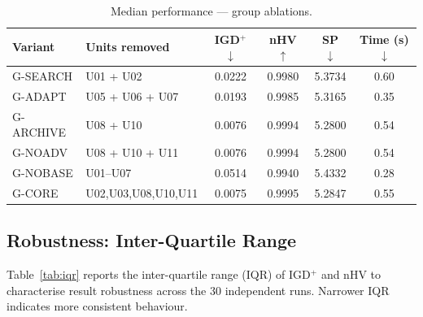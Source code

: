\documentclass[11pt,a4paper]{article}
\begin{document}
\begin{table}[H]
\centering
\caption{Median performance --- group ablations.}
\label{tab:res_group}
\renewcommand{\arraystretch}{1.25}
\setlength{\tabcolsep}{6pt}
\small
\begin{tabular}{l l
    S[table-format=1.4]
    S[table-format=1.4]
    S[table-format=1.4]
    S[table-format=2.2]}
\toprule
\textbf{Variant} & \textbf{Units removed} &
  {\textbf{IGD}$^+$ $\downarrow$} &
  {\textbf{nHV} $\uparrow$} &
  {\textbf{SP} $\downarrow$} &
  {\textbf{Time (s)} $\downarrow$} \\
\midrule
G-SEARCH  & U01 + U02         & 0.0222 & 0.9980 & 5.3734 & 0.60 \\
G-ADAPT   & U05 + U06 + U07   & 0.0193 & 0.9985 & 5.3165 & 0.35 \\
G-ARCHIVE & U08 + U10         & 0.0076 & 0.9994 & 5.2800 & 0.54 \\
G-NOADV   & U08 + U10 + U11   & 0.0076 & 0.9994 & 5.2800 & 0.54 \\
G-NOBASE  & U01--U07          & 0.0514 & 0.9940 & 5.4332 & 0.28 \\
G-CORE    & U02,U03,U08,U10,U11 & 0.0075 & 0.9995 & 5.2847 & 0.55 \\
\bottomrule
\end{tabular}
\end{table}

\subsection{Robustness: Inter-Quartile Range}
\label{sec:results_iqr}

Table~\ref{tab:iqr} reports the inter-quartile range (IQR) of IGD$^+$
and nHV to characterise result robustness across the 30 independent runs.
Narrower IQR indicates more consistent behaviour.
\end{document}
